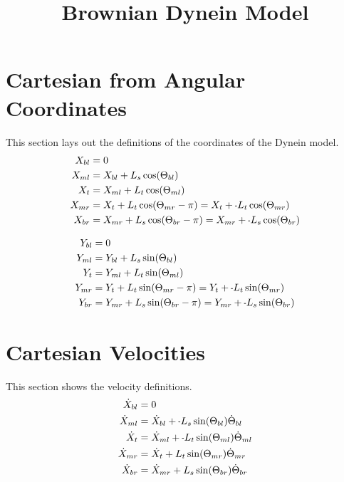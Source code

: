 \documentclass[11pt, landscape]{article}
\title{Brownian Dynein Model}
\newcommand{\mn}{\scalebox{0.7}[1.0]{-}}
\begin{document}
\maketitle

\section{Cartesian from Angular Coordinates}
This section lays out the definitions of the coordinates of the Dynein model. \\
\begin{align}
  X_{bl} &= 0 \\
  X_{ml} &= X_{bl}+L_{s}\cos(\Theta_{bl}) \\
  X_{t}  &= X_{ml}+L_{t}\cos(\Theta_{ml}) \\
  X_{mr} &= X_{t} +L_{t}\cos(\Theta_{mr}-\pi) = X_{t} + \mn L_{t}\cos(\Theta_{mr}) \\
  X_{br} &= X_{mr}+L_{s}\cos(\Theta_{br}-\pi) = X_{mr}+ \mn L_{s}\cos(\Theta_{br})
\end{align}

\begin{align}
  Y_{bl} &= 0 \\
  Y_{ml} &= Y_{bl}+L_{s}\sin(\Theta_{bl}) \\
  Y_{t}  &= Y_{ml}+L_{t}\sin(\Theta_{ml}) \\
  Y_{mr} &= Y_{t} +L_{t}\sin(\Theta_{mr}-\pi) = Y_{t} + \mn L_{t}\sin(\Theta_{mr}) \\
  Y_{br} &= Y_{mr}+L_{s}\sin(\Theta_{br}-\pi) = Y_{mr}+ \mn L_{s}\sin(\Theta_{br})
\end{align}

\section{Cartesian Velocities}
This section shows the velocity definitions. \\
\begin{align}
  \dot{X}_{bl} &= 0 \\
  \dot{X}_{ml} &= \dot{X}_{bl} + \mn L_{s}\sin(\Theta_{bl})\dot{\Theta}_{bl} \\
  \dot{X}_{t } &= \dot{X}_{ml} + \mn L_{t}\sin(\Theta_{ml})\dot{\Theta}_{ml} \\
  \dot{X}_{mr} &= \dot{X}_{t } + L_{t}\sin(\Theta_{mr})\dot{\Theta}_{mr} \\
  \dot{X}_{br} &= \dot{X}_{mr} + L_{s}\sin(\Theta_{br})\dot{\Theta}_{br}
\end{align}  
             
\end{document}
